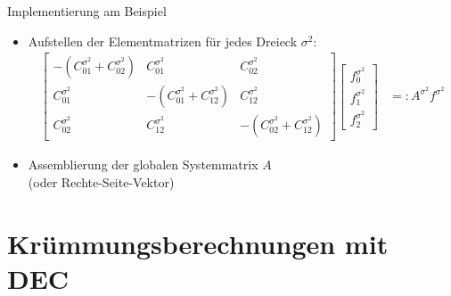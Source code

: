 \documentclass[handout]{beamer}
\begin{document}
  \begin{frame}
    \begin{block}{Implementierung am Beispiel}
      \begin{itemize}
        \item<1-> Aufstellen der Elementmatrizen für jedes Dreieck \( \sigma^{2} \):
          {\small
          \begin{align*}
            \begin{bmatrix}
        -\left( C^{\sigma^{2}}_{01} + C^{\sigma^{2}}_{02}\right) & C^{\sigma^{2}}_{01} & C^{\sigma^{2}}_{02} \\
        C^{\sigma^{2}}_{01} & -\left( C^{\sigma^{2}}_{01} + C^{\sigma^{2}}_{12}\right) & C^{\sigma^{2}}_{12} \\
        C^{\sigma^{2}}_{02} & C^{\sigma^{2}}_{12} & -\left( C^{\sigma^{2}}_{02} + C^{\sigma^{2}}_{12}\right)
      \end{bmatrix}
      \begin{bmatrix}
        f^{\sigma^{2}}_{0} \\ f^{\sigma^{2}}_{1} \\ f^{\sigma^{2}}_{2}
      \end{bmatrix}
        &=: A^{\sigma^{2}} f^{\sigma^{2}}
          \end{align*}}
        \item<2-> Assemblierung der globalen Systemmatrix \( A \) \\(oder Rechte-Seite-Vektor)
      \end{itemize}
    \end{block}
  \end{frame}


\section{Krümmungsberechnungen mit DEC}
  
\end{document}
